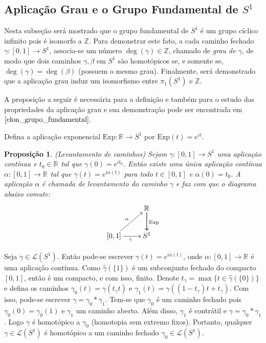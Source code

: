 \documentclass[12pt]{book}
\newtheorem{proposicao}[teorema]{Proposição}
\newcommand{\caminhos}{\mathcal{L}}
\newcommand{\caminhossempontobase}[1]{\caminhos(#1)}
\newcommand{\circulo}{S^{1}}
\newcommand{\Exp}{\text{Exp}}
\newcommand{\inteiros}{\mathbb{Z}}
\newcommand{\intervalo}{[0,1]}
\newcommand{\real}[1]{\mathbb{R}^{#1}}
\newcommand{\reta}{\real{}}
\begin{document}
	\subsection{Aplicação Grau e o Grupo Fundamental de $\circulo$}
	Nesta subseção será mostrado que o grupo fundamental de $S^{1}$ é um grupo cíclico infinito pois é isomorfo a $\inteiros$. Para demonstrar este fato, a cada caminho fechado $\gamma:[0,1] \to S^{1}$, associa-se um número $\deg(\gamma) \in \inteiros$, chamado de \textit{grau de $\gamma$}, de modo que dois caminhos $\gamma, \beta$ em $S^{1}$ são homotópicos se, e somente se, $\deg(\gamma) = \deg(\beta)$ (possuem o mesmo grau). Finalmente, será demonstrado que a aplicação grau induz um isomorfismo entre $\pi_{1}(S^{1})$ e $\inteiros$.
	
	A proposição a seguir é necessária para a definição e também para o estudo das propriedades da aplicação grau e sua demonstração pode ser encontrada em $\cite{elon_grupo_fundamental}$.
	
	Defina a aplicação exponencial $\Exp: \reta\to \circulo$ por $\Exp(t) = e^{it}$.
	
	\begin{proposicao}\label{proposicao_levantamento_curvas}
		(Levantamento de caminhos) Sejam $\gamma:\intervalo \to S^{1}$ uma aplicação contínua e $t_{0}\in \real{}$ tal que $\gamma(0) = e^{it_{0}}$. Então existe uma única aplicação contínua $\alpha:\intervalo\to \real{}$ tal que $\gamma(t) = e^{i\alpha(t)}$ para todo $t\in \intervalo$ e $\alpha(0) = t_{0}$. A aplicação $\alpha$ é chamada de levantamento do caminho $\gamma$ e faz com que o diagrama abaixo comute:
		$$
		\xymatrix{
			& \real{}\ar[d]\ar[d]^{\Exp}
			\\
			\intervalo\ar[ur]^{\alpha} \ar[r]_{\gamma} & S^{1}
		}
		$$
	\end{proposicao}
	
	Seja $\gamma \in \caminhossempontobase{\circulo}$. Então pode-se escrever $\gamma(t) = e^{i\alpha(t)}$, onde $\alpha:\intervalo \to \reta$ é uma aplicação contínua. Como $\hat{\gamma} (\{1\})$ é um subconjunto fechado do compacto $\intervalo$, então é um compacto, e com isso, finito. Denote $t_{\gamma} = \max\{t \in \hat{\gamma} (\{0\})\}$ e defina os caminhos $\gamma_{0}(t) = \gamma(t_{\gamma}t)$ e $\gamma_{1}(t) = \gamma((1-t_{\gamma})t+t_{\gamma})$. Com isso, pode-se escrever $\gamma = \gamma_{0}*\gamma_{1}$. Tem-se que $\gamma_{0}$ é um caminho fechado pois $\gamma_{0}(0) = \gamma_{0}(1)$ e $\gamma_{1}$ um caminho aberto. Além disso, $\gamma_{1}$ é contrátil e $\gamma = \gamma_{0}*\gamma_{1}$. Logo $\gamma$ é homotópico a $\gamma_{0}$ (homotopia sem extremo fixos). Portanto, qualquer $\gamma \in \caminhos(\circulo)$ é homotópico a um caminho fechado $\gamma_{0} \in \caminhos(\circulo)$.
	
\end{document}
